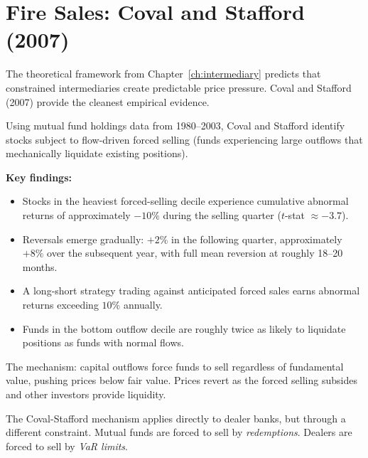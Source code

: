 \section{Fire Sales: Coval and Stafford (2007)}
\label{sec:fire-sales}

The theoretical framework from Chapter~\ref{ch:intermediary} predicts
that constrained intermediaries create predictable price pressure.
Coval and Stafford (2007) provide the cleanest empirical evidence.

\begin{keyresult}
Using mutual fund holdings data from 1980--2003, Coval and Stafford
identify stocks subject to flow-driven forced selling (funds
experiencing large outflows that mechanically liquidate existing
positions).

\textbf{Key findings:}
\begin{itemize}[nosep]
  \item Stocks in the heaviest forced-selling decile experience
        cumulative abnormal returns of approximately $-10\%$ during
        the selling quarter ($t$-stat $\approx -3.7$).
  \item Reversals emerge gradually: $+2\%$ in the following quarter,
        approximately $+8\%$ over the subsequent year, with full mean
        reversion at roughly 18--20 months.
  \item A long-short strategy trading against anticipated forced
        sales earns abnormal returns exceeding $10\%$ annually.
  \item Funds in the bottom outflow decile are roughly twice as
        likely to liquidate positions as funds with normal flows.
\end{itemize}
The mechanism: capital outflows force funds to sell regardless of
fundamental value, pushing prices below fair value.  Prices revert
as the forced selling subsides and other investors provide liquidity.
\end{keyresult}

The Coval-Stafford mechanism applies directly to dealer banks, but
through a different constraint.  Mutual funds are forced to sell by
\emph{redemptions}.  Dealers are forced to sell by \emph{VaR limits}.

